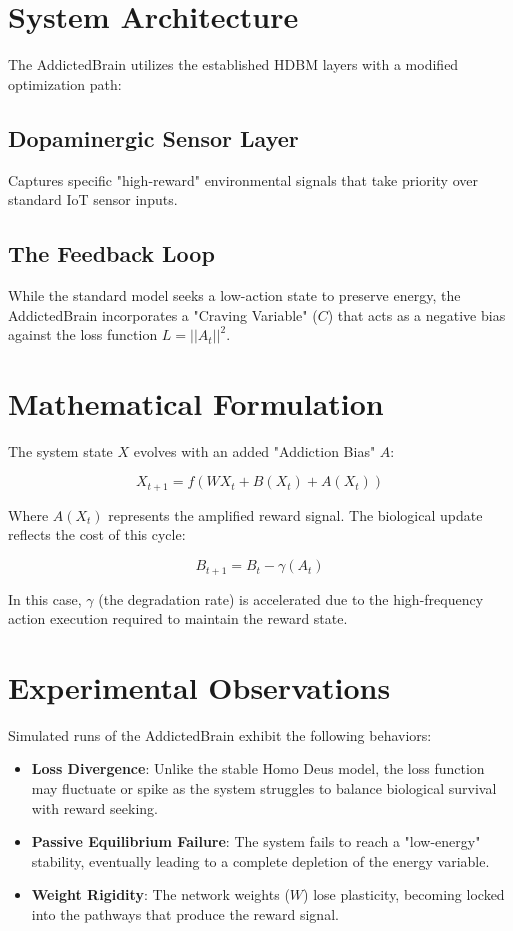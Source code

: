 \documentclass[12pt]{article}
\begin{document}
\section{System Architecture}

The AddictedBrain utilizes the established HDBM layers with a modified optimization path:

\subsection{Dopaminergic Sensor Layer}
Captures specific "high-reward" environmental signals that take priority over standard IoT sensor inputs.

\subsection{The Feedback Loop}
While the standard model seeks a low-action state to preserve energy, the AddictedBrain incorporates a "Craving Variable" ($C$) that acts as a negative bias against the loss function $L = ||A_t||^2$.

\section{Mathematical Formulation}

The system state $X$ evolves with an added "Addiction Bias" $A$:

\[
X_{t+1} = f(WX_t + B(X_t) + A(X_t))
\]

Where $A(X_t)$ represents the amplified reward signal. The biological update reflects the cost of this cycle:

\[
B_{t+1} = B_t - \gamma(A_t)
\]

In this case, $\gamma$ (the degradation rate) is accelerated due to the high-frequency action execution required to maintain the reward state.

\section{Experimental Observations}

Simulated runs of the AddictedBrain exhibit the following behaviors:

\begin{itemize}
\item \textbf{Loss Divergence}: Unlike the stable Homo Deus model, the loss function may fluctuate or spike as the system struggles to balance biological survival with reward seeking.
\item \textbf{Passive Equilibrium Failure}: The system fails to reach a "low-energy" stability, eventually leading to a complete depletion of the energy variable.
\item \textbf{Weight Rigidity}: The network weights ($W$) lose plasticity, becoming locked into the pathways that produce the reward signal.
\end{itemize}
\end{document}

